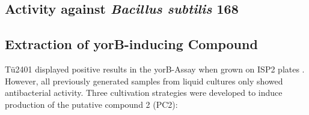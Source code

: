 
    \subsection{Activity against \textit{Bacillus subtilis} 168} %
    \label{sub:activity_against_b_subtilis}


    \subsection{Extraction of yorB-inducing Compound} %
    \label{sub:extraction_of_yorb_inducing_compound}

    Tü2401 displayed positive results in the yorB-Assay  when grown on ISP2 plates . However, all previously generated samples from liquid cultures only showed antibacterial activity.
    Three cultivation strategies were developed to induce production of the putative compound 2 (PC2):

